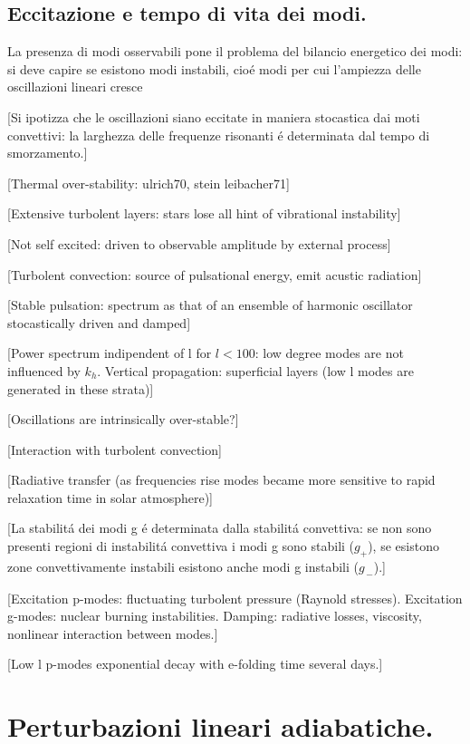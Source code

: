 \documentclass[../main.tex]{subfiles}
\begin{document}
\section{Eccitazione e tempo di vita dei modi.}

La presenza di modi osservabili pone il problema del bilancio energetico dei modi: si deve capire se esistono modi instabili, cio\'e modi per cui l'ampiezza delle oscillazioni lineari cresce


[Si ipotizza che le oscillazioni siano eccitate in maniera stocastica dai moti convettivi: la larghezza delle frequenze risonanti \'e determinata dal tempo di smorzamento.]

[Thermal over-stability: ulrich70, stein leibacher71]

[Extensive turbolent layers: stars lose all hint of vibrational instability]

[Not self excited: driven to observable amplitude by external process]

[Turbolent convection: source of pulsational energy, emit acustic radiation]

[Stable pulsation: spectrum as that of an ensemble of harmonic oscillator stocastically driven and damped]

[Power spectrum indipendent of l for $l<100$: low degree modes are not influenced by $k_h$. Vertical propagation: superficial layers (low l modes are generated in these strata)]

[Oscillations are intrinsically over-stable?]

[Interaction with turbolent convection]

[Radiative transfer (as frequencies rise modes became more sensitive to rapid relaxation time in solar atmosphere)]

[La stabilit\'a dei modi g \'e determinata dalla stabilit\'a convettiva: se non sono presenti regioni di instabilit\'a convettiva i modi g sono stabili ($g_+$), se esistono zone convettivamente instabili esistono anche modi g instabili ($g_{\,-}$).]

[Excitation p-modes: fluctuating turbolent pressure (Raynold stresses). Excitation g-modes: nuclear burning instabilities. Damping: radiative losses, viscosity, nonlinear interaction between modes.]

[Low l p-modes exponential decay with e-folding time several days.]


{\let\clearpage\relax
\chapter{Perturbazioni lineari adiabatiche.}
}
\end{document}
